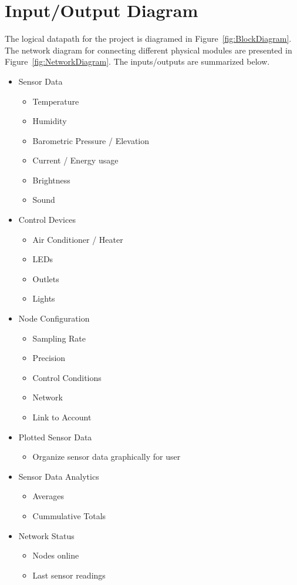 	 \section{Input/Output Diagram}
		 The logical datapath for the project is diagramed in Figure~\ref{fig:BlockDiagram}. The network diagram for connecting different physical modules are presented in Figure~\ref{fig:NetworkDiagram}. The inputs/outputs are summarized below.
		 \begin{itemize}
		 	\item Sensor Data
		 	\begin{itemize}
		 		\item Temperature
		 		\item Humidity
		 		\item Barometric Pressure / Elevation
		 		\item Current / Energy usage
		 		\item Brightness
		 		\item Sound
		 	\end{itemize}
		 	\item Control Devices
		 	\begin{itemize}
		 		\item Air Conditioner / Heater
		 		\item LEDs
		 		\item Outlets
		 		\item Lights
		 	\end{itemize}
		 	\item Node Configuration
		 	\begin{itemize}
		 		\item Sampling Rate
		 		\item Precision
		 		\item Control Conditions
		 		\item Network
		 		\item Link to Account
		 	\end{itemize}
		 	\item Plotted Sensor Data
		 	\begin{itemize}
		 		\item Organize sensor data graphically for user
		 	\end{itemize}
		 	\item Sensor Data Analytics
		 	\begin{itemize}
		 		\item Averages
		 		\item Cummulative Totals
		 	\end{itemize}
		 	\item Network Status
		 	\begin{itemize}
		 		\item Nodes online
		 		\item Last sensor readings
		 	\end{itemize}
		 \end{itemize}
	 
